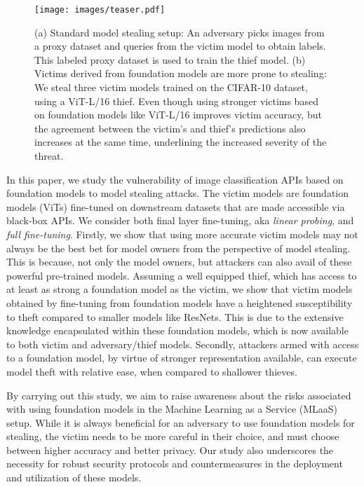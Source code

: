 \begin{figure*}[t]
	\centering
	\texttt{[image: images/teaser.pdf]}
	\caption{(a) Standard model stealing setup: An adversary picks images from a proxy dataset and queries from the victim model to obtain labels. This labeled proxy dataset is used to train the thief model. (b) Victims derived from foundation models are more prone to stealing: We steal three victim models trained on the CIFAR-10 dataset, using a ViT-L/16 thief. Even though using stronger victims based on foundation models like ViT-L/16 improves victim accuracy, but the agreement between the victim's and thief's predictions also increases at the same time, underlining the increased severity of the threat.}
	\label{teaser}
\end{figure*}

%
In this paper, we study the vulnerability of image classification APIs based on foundation models to model stealing attacks. The victim models are foundation models (ViTs) fine-tuned on downstream datasets that are made accessible via black-box APIs. We consider both final layer fine-tuning, aka \emph{linear probing}, and \emph{full fine-tuning}. 
%
Firstly, we show that using more accurate victim models may not always be the best bet for model owners from the perspective of model stealing. This is because, not only the model owners, but attackers can also avail of these powerful pre-trained models. Assuming a well equipped thief, which has access to at least as strong a foundation model as the victim, we show that victim models obtained by fine-tuning from foundation models have a heightened susceptibility to theft compared to smaller models like ResNets. This is due to the extensive knowledge encapsulated within these foundation models, which is now available to both victim and adversary/thief models. 
Secondly, attackers armed with access to a foundation model, by virtue of stronger representation available, can execute model theft with relative ease, when compared to shallower thieves. 

%
By carrying out this study, we aim to raise awareness about the risks associated with using foundation models in the Machine Learning as a Service (MLaaS) setup. While it is always beneficial for an adversary to use foundation models for stealing, the victim needs to be more careful in their choice, and must choose between higher accuracy and better privacy. Our study also underscores the necessity for robust security protocols and countermeasures in the deployment and utilization of these models.

